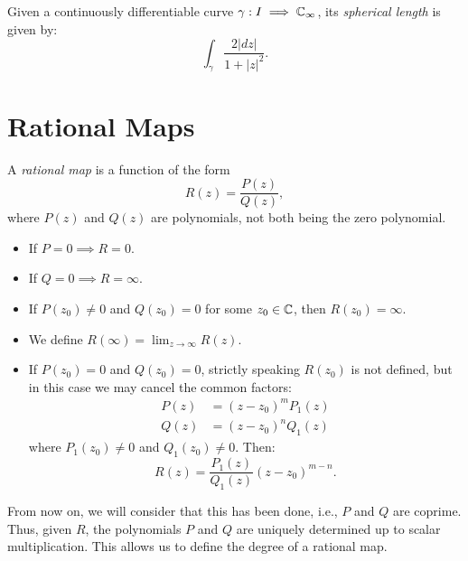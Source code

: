 \begin{remark}
    Given a continuously differentiable curve $\gamma : I \implies \mathbb{C}_\infty$,
    its \emph{spherical length} is given by:
    \begin{equation*}
        \int_{\gamma} \frac{2|d z|}{1+|z|^2}.
    \end{equation*}
\end{remark}

\section{Rational Maps}
\label{sec:rational_maps}

\begin{definition}
    A \emph{rational map} is a function of the form
    \begin{equation*}
        R(z) = \frac{P(z)}{Q(z)},
    \end{equation*}
    where $P(z)$ and $Q(z)$ are polynomials, not both being the zero polynomial.
\end{definition}

\begin{itemize}
    \item If $P = 0 \implies R = 0$.
    \item If $Q = 0 \implies R = \infty$.
    \item If $P(z_0) \neq 0$ and $Q(z_0) = 0$ for some $z_0 \in \mathbb{C}$, then
    $R(z_0) = \infty$.
    \item We define $R(\infty) = \lim_{z \to \infty} R(z)$.
    \item If $P(z_0) = 0$ and $Q(z_0) = 0$, strictly speaking $R(z_0)$ is not
    defined, but in this case we may cancel the common factors:
    \begin{align*}
        P(z) &= (z-z_0)^m P_1(z) \\
        Q(z) &= (z-z_0)^n Q_1(z)
    \end{align*}
    where $P_1(z_0) \neq 0$ and $Q_1(z_0) \neq 0$. Then:
    \begin{equation*}
        R(z) = \frac{P_1(z)}{Q_1(z)} (z-z_0)^{m-n}.
    \end{equation*}
\end{itemize}

From now on, we will consider that this has been done, i.e., $P$ and $Q$ are
coprime. Thus, given $R$, the polynomials $P$ and $Q$ are uniquely determined up
to scalar multiplication. This allows us to define the degree of a rational map.

